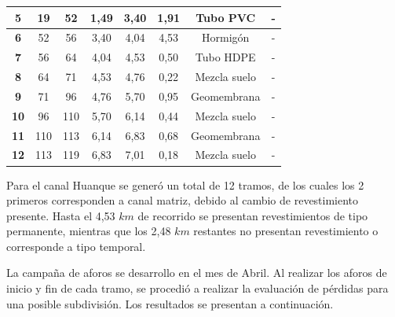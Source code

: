 \documentclass[]{article}
\begin{document}
\begin{table}[H]
\begin{tabular}{|c|c|c|c|c|c|c|c|}
\textbf{5} & 19 & 52 & 1,49 & 3,40 & 1,91 & Tubo PVC & - \\ \hline                                                                                      
\textbf{6} & 52 & 56 & 3,40 & 4,04 & 4,53 & Hormigón & - \\ \hline
\textbf{7} & 56 & 64 & 4,04 & 4,53 & 0,50 & Tubo HDPE & - \\ \hline                                                                                                                                                                            
\textbf{8} & 64 & 71 & 4,53 & 4,76 & 0,22 & Mezcla suelo & - \\ \hline                                                                                      
\textbf{9} & 71 & 96 & 4,76 & 5,70 & 0,95 & Geomembrana & - \\ \hline                                                                                      
\textbf{10} & 96 & 110 & 5,70 & 6,14 & 0,44 & Mezcla suelo & - \\ \hline
\textbf{11} & 110& 113 & 6,14 & 6,83 & 0,68 & Geomembrana & - \\ \hline
\textbf{12} & 113 & 119 & 6,83 & 7,01 & 0,18 & Mezcla suelo & - \\ \hline
\end{tabular}
\end{table}

Para el canal Huanque se generó un total de 12 tramos, de los cuales los 2 primeros corresponden a canal matriz, debido al cambio de revestimiento presente. Hasta el 4,53 $km$ de recorrido se presentan revestimientos de tipo permanente, mientras que los 2,48 $km$ restantes no presentan revestimiento o corresponde a tipo temporal.

La campaña de aforos se desarrollo en el mes de Abril. Al realizar los aforos de inicio y fin de cada tramo, se procedió a realizar la evaluación de pérdidas para una posible subdivisión. Los resultados se presentan a continuación.
\end{document}
